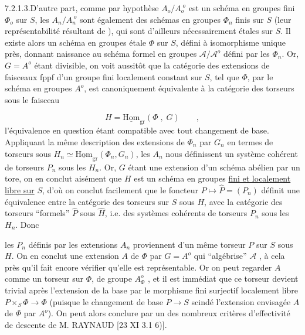 7.2.1.3.\quad D'autre part, comme par hypothèse $A_{o}/A_{o}^{\;o}$ est un schéma en groupes fini $\Phi_{o}$ sur $S$, les $A_{n}/A_{n}^{\;o}$ sont également des schémas en groupes $\Phi_{n}$ finis sur $S$ (leur représentabilité résultant de \hspace{3cm}), qui sont d'ailleurs nécessairement étales sur $S$. Il existe alors un schéma en groupes étale $\Phi$ sur $S$, défini à isomorphisme unique près, donnant naissance au schéma formel en groupes $\mathcal{A}/\mathcal{A}^{o}$ défini par les $\Phi_{n}$. Or, $G = A^{o}$ étant divisible, on voit aussitôt que la catégorie des extensions de faisceaux fppf d'un groupe fini localement constant sur $S$, tel que $\Phi$, par le schéma en groupes $A^{o}$, est canoniquement équivalente à la catégorie des torseurs sous le faisceau

\begin{equation*}
H = \underline{\mathrm{Hom}}_{\mathrm{gr}}(\Phi \; , \; G) \qquad ,
\end{equation*}
l'équivalence en question étant compatible avec tout changement de base. Appliquant la même description des extensions de $\Phi_{n}$ par $G_{n}$ en termes de torseurs sous $H_{n} \simeq \underline{\mathrm{Hom}}_{\mathrm{gr}}(\Phi_{n},G_{n})$, les $A_{n}$ nous définissent un système cohérent de torseurs $P_{n}$ sous les $H_{n}$. Or, $G$ étant une extension d'un schéma abélien par un tore, on en conclut aisément que $H$ est un schéma en groupes \underline{fini et localement libre sur} $S$, d'où on conclut facilement que le foncteur $P \longmapsto \hat{P} = (P_{n})$ définit une équivalence entre la catégorie des torseurs sur $S$ sous $H$, avec la catégorie des torseurs ``formels'' $\hat{P}$ sous $\hat{H}$, i.e. des systèmes cohérents de torseurs $P_{n}$ sous les $H_{n}$. Donc



les $P_{n}$ définis par les extensions $A_{n}$ proviennent d'un même torseur $P$ sur $S$ sous $H$. On en conclut une extension $A$ de $\Phi$ par $G = A^{o}$ qui ``algébrise'' $\mathcal{A}$ , à cela près qu'il fait encore vérifier qu'elle est représentable. Or on peut regarder $A$ comme un torseur sur $\Phi$, de groupe $A_{\Phi}^{o}$ , et il est immédiat que ce torseur devient trivial après l'extension de la base par le morphisme fini surjectif localement libre $P \times_{S} \Phi \longrightarrow \Phi$ (puisque le changement de base $P \longrightarrow S$ scindé l'extension envisagée $A$ de $\Phi$ par $A^{o}$). On peut alors conclure par \hspace{1.5cm} un des nombreux critères d'effectivité de descente de M. RAYNAUD [23 XI 3.1 6)].

